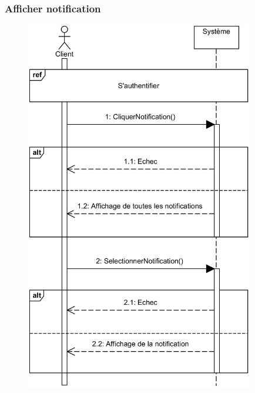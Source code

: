    \subsubsection[Afficher notification]{Afficher notification}
        \begin{figure}[H]
            \centering
            \includegraphics[width=100mm]{images/diagramme-de-sequence/sd-notification.png}
            \label{fig:sdAffNotification}
        \end{figure}
\pagebreak
